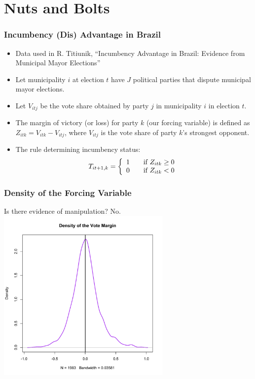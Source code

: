\documentclass{beamer}
\begin{document}
\section{Nuts and Bolts}

\begin{frame}
  \frametitle{Incumbency (Dis) Advantage in Brazil}
  \begin{itemize}
  \item  Data used in R. Titiunik, ``Incumbency Advantage in Brazil:
    Evidence from Municipal Mayor Elections''
 \item Let municipality $i$ at election $t$ have $J$ political parties
   that dispute municipal mayor elections.
 \item Let $V_{itj}$ be the vote share obtained by party $j$ in
   municipality $i$ in election $t$. 
 \item The margin of victory (or loss) for party $k$ (our forcing variable) is
   defined as $Z_{itk}=V_{itk}-V_{itj}$, where $V_{itj}$ is the vote share of
  party $k$'s strongest opponent. 
\item The rule determining incumbency status:  
\[ T_{it+1,k} = \left\{ 
\begin{array}{l l}
  1 & \quad \mbox{if $Z_{itk} \geq 0$} \\
  0 & \quad \mbox{if  $Z_{itk} < 0$} \\
\end{array}
 \right. \]
\end{itemize}

\end{frame}

\begin{frame}
  \frametitle{Density of the Forcing Variable}
Is there evidence of manipulation?  No. 
  \includegraphics[width=8.5cm]{forcingvar_density.pdf}  
\end{frame}
\end{document}
